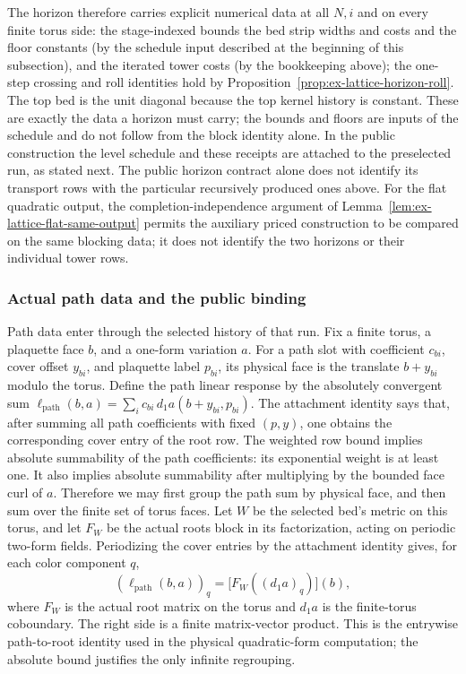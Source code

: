 The horizon therefore carries explicit numerical data at all $N,i$ and
on every finite torus side: the stage-indexed bounds the bed strip
widths and costs and the floor constants (by the schedule input described
at the beginning of this subsection), and the iterated tower costs (by the
bookkeeping above); the one-step crossing and roll identities hold by
Proposition~\ref{prop:ex-lattice-horizon-roll}. The top bed is the unit diagonal because the
top kernel history is constant. These are exactly the data a horizon must carry;
the bounds and floors are inputs of the schedule and do not follow from
the block identity alone. In the public
construction the level schedule and these receipts are attached to the
preselected run, as stated next. The public horizon contract alone does
not identify its transport rows with the particular recursively produced
ones above. For the flat quadratic output, the completion-independence
argument of Lemma~\ref{lem:ex-lattice-flat-same-output} permits the
auxiliary priced construction to be compared on the same blocking data;
it does not identify the two horizons or their individual tower rows.

\subsubsection{Actual path data and the public binding}
\label{subsec:ex-lattice-horizon-path}

Path data enter through the selected history of that run. Fix a finite
torus, a plaquette face $b$, and a one-form variation $a$. For a path slot
with coefficient $c_{b i}$, cover offset $y_{b i}$, and plaquette label
$p_{b i}$, its physical face is the translate $b+y_{b i}$ modulo the
torus. Define the path linear response by the absolutely convergent sum
$\ell_{\mathrm{path}}(b,a)=\sum_i c_{b i}\,d_1a(b+y_{b i},p_{b i})$. The attachment identity says that, after
summing all path coefficients with fixed $(p,y)$, one obtains the
corresponding cover entry of the root row. The weighted row bound implies
absolute summability of the path coefficients: its exponential weight is
at least one. It also implies absolute summability after multiplying by
the bounded face curl of $a$. Therefore we may first group the path sum
by physical face, and then sum over the finite set of torus faces.
Let $W$ be the selected bed's metric on this torus, and let $F_W$ be
the actual roots block in its factorization, acting on periodic two-form
fields. Periodizing the cover entries by the
attachment identity gives, for each color component $q$,
\[
 (\ell_{\mathrm{path}}(b,a))_q=\bigl[F_W((d_1a)_q)\bigr](b),
\]
where $F_W$ is the actual root matrix on the torus and $d_1a$ is the
finite-torus coboundary. The right side is a finite matrix-vector
product. This is the entrywise path-to-root identity used in the physical
quadratic-form computation; the absolute bound justifies the only
infinite regrouping.

